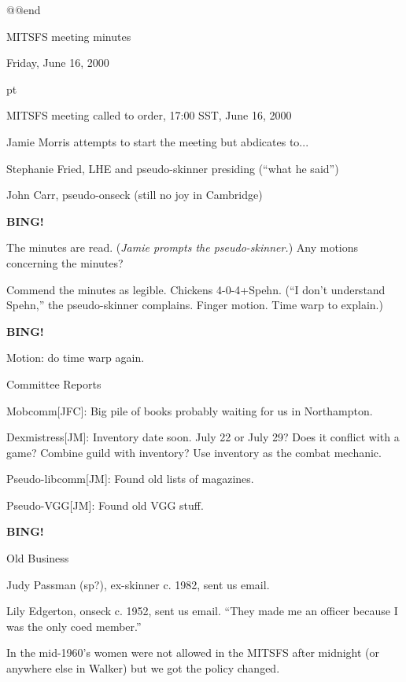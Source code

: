 \ifx\documentstyle\thisMacroOughtNotBeDefined
\else
  \immediate{}
  \immediate{}
  \immediate{}
  \batchmode \makeatletter @@end
\fi


\centerline{MITSFS meeting minutes}
\centerline{Friday, June 16, 2000}

 pt

MITSFS meeting called to order, 17:00 SST, June 16, 2000

Jamie Morris attempts to start the meeting but abdicates to...

Stephanie Fried, LHE and pseudo-skinner presiding (``what he said'')

John Carr, pseudo-onseck (still no joy in Cambridge)

{\bf BING!}

\vskip 12pt

The minutes are read.  ({\it Jamie prompts the pseudo-skinner.})
Any motions concerning the minutes?

Commend the minutes as legible.  Chickens \hbox{4-0-4+Spehn}.
(``I don't understand Spehn,'' the pseudo-skinner complains.
Finger motion.  Time warp to explain.)

{\bf BING!}

Motion: do time warp again.

\vskip 12pt

\centerline{Committee Reports}

\vskip 12pt

Mobcomm[JFC]: Big pile of books probably waiting for us in Northampton.

Dexmistress[JM]: Inventory date soon.  July 22 or July 29?
Does it conflict with a game?  Combine guild with inventory?
Use inventory as the combat mechanic.

Pseudo-libcomm[JM]: Found old lists of magazines.

Pseudo-VGG[JM]: Found old VGG stuff.

{\bf BING!}

\vskip 12pt

\centerline{Old Business}

\vskip 12pt

Judy Passman (sp?), ex-skinner c. 1982, sent us email.

Lily Edgerton, onseck c. 1952, sent us email.
``They made me an officer because I was the only coed member.''

In the mid-1960's women were not allowed in the MITSFS after midnight
(or anywhere else in Walker) but we got the policy changed.

